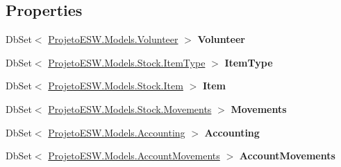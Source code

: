 \subsection*{Properties}
\begin{DoxyCompactItemize}
\item 
\mbox{\label{class_projeto_e_s_w_1_1_data_1_1_application_db_context_a3af10206d2e287c032b072ba90a0142a}} 
Db\+Set$<$ \mbox{\hyperlink{class_projeto_e_s_w_1_1_models_1_1_volunteer}{Projeto\+E\+S\+W.\+Models.\+Volunteer}} $>$ {\bfseries Volunteer}
\item 
\mbox{\label{class_projeto_e_s_w_1_1_data_1_1_application_db_context_a2ada34a2b9e685fda96a13d52abef193}} 
Db\+Set$<$ \mbox{\hyperlink{class_projeto_e_s_w_1_1_models_1_1_stock_1_1_item_type}{Projeto\+E\+S\+W.\+Models.\+Stock.\+Item\+Type}} $>$ {\bfseries Item\+Type}
\item 
\mbox{\label{class_projeto_e_s_w_1_1_data_1_1_application_db_context_a5a951a0e30981bf78c675f228a7c8a42}} 
Db\+Set$<$ \mbox{\hyperlink{class_projeto_e_s_w_1_1_models_1_1_stock_1_1_item}{Projeto\+E\+S\+W.\+Models.\+Stock.\+Item}} $>$ {\bfseries Item}
\item 
\mbox{\label{class_projeto_e_s_w_1_1_data_1_1_application_db_context_ad2a29837111f61c87c3e17e211b150c4}} 
Db\+Set$<$ \mbox{\hyperlink{class_projeto_e_s_w_1_1_models_1_1_stock_1_1_movements}{Projeto\+E\+S\+W.\+Models.\+Stock.\+Movements}} $>$ {\bfseries Movements}
\item 
\mbox{\label{class_projeto_e_s_w_1_1_data_1_1_application_db_context_ab0a4738d29f68ca95d3acefd73c19a98}} 
Db\+Set$<$ \mbox{\hyperlink{class_projeto_e_s_w_1_1_models_1_1_accounting}{Projeto\+E\+S\+W.\+Models.\+Accounting}} $>$ {\bfseries Accounting}
\item 
\mbox{\label{class_projeto_e_s_w_1_1_data_1_1_application_db_context_a2e5d65487e5d454a527dc7776d9b281a}} 
Db\+Set$<$ \mbox{\hyperlink{class_projeto_e_s_w_1_1_models_1_1_account_movements}{Projeto\+E\+S\+W.\+Models.\+Account\+Movements}} $>$ {\bfseries Account\+Movements}
\end{DoxyCompactItemize}


